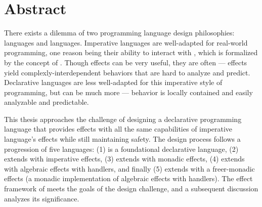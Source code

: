 \chapter*{Abstract}
There exists a dilemma of two programming language design philosophies:  languages and  languages.
Imperative languages are well-adapted for real-world programming, one reason being their ability to interact with , which is formalized by the concept of .
Though effects can be very useful, they are often  --- effects yield complexly-interdependent behaviors that are hard to analyze and predict.
Declarative languages are less well-adapted for this imperative style of programming, but can be much more  --- behavior is locally contained and easily analyzable and predictable.

This thesis approaches the challenge of designing a declarative programming language that provides effects with all the same capabilities of imperative language's effects while still maintaining safety.
The design process follows a progression of five languages:
(1) \LangA is a foundational declarative language,
(2) \LangB extends \LangA with imperative effects,
(3) \LangC extends \LangA with monadic effects,
(4) \LangD extends \LangA with algebraic effects with handlers, and finally
(5) \LangE extends \LangC with a freer-monadic effects (a monadic implementation of algebraic effects with handlers).
The effect framework of \LangE meets the goals of the design challenge, and a subsequent discussion analyzes its significance.
